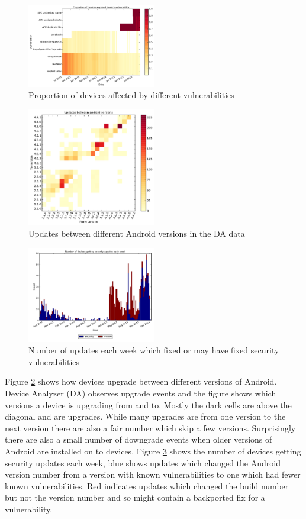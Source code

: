 \documentclass[conference,a4paper,twoside]{IEEEtran}
\begin{document}
\begin{figure}
 \includegraphics[width=0.5\textwidth]{figures/nvulnerabilities_heat.pdf}
 \caption{Proportion of devices affected by different vulnerabilities}
 \label{fig:nvulnerabilities_heat}
\end{figure}
\begin{figure}
 \includegraphics[width=0.5\textwidth]{figures/from_to_updates.pdf}
 \caption{Updates between different Android versions in the DA data}
 \label{fig:from_to_updates}
\end{figure}
\begin{figure}
 \includegraphics[width=0.5\textwidth]{figures/w_security_updates.pdf}
 \caption{Number of updates each week which fixed or may have fixed security vulnerabilities}
 \label{fig:weekly_security_updates}
\end{figure}
Figure \ref{fig:from_to_updates} shows how devices upgrade between different versions of Android.
Device Analyzer (DA) observes upgrade events and the figure shows which versions a device is upgrading from and to.
Mostly the dark cells are above the diagonal and are upgrades.
While many upgrades are from one version to the next version there are also a fair number which skip a few versions.
Surprisingly there are also a small number of downgrade events when older versions of Android are installed on to devices.
Figure \ref{fig:weekly_security_updates} shows the number of devices getting security updates each week, blue shows updates which changed the Android version number from a version with known vulnerabilities to one which had fewer known vulnerabilities.
Red indicates updates which changed the build number but not the version number and so might contain a backported fix for a vulnerability.
\end{document}
